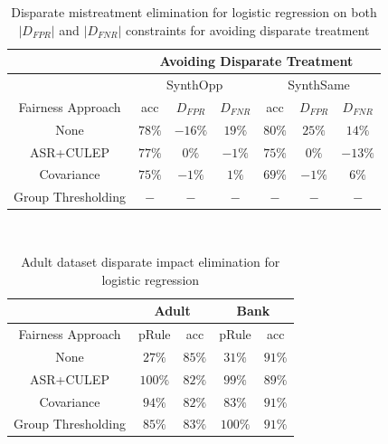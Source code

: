 \documentclass[runningheads]{llncs}
\begin{document}
\begin{table}[!htbp]
      \centering
\begin{tabular}{|c|c|c|c|c|c|c|}
\hline
{} & \multicolumn{6}{c}{Avoiding Disparate Treatment} \vline \\
\hline
{} & \multicolumn{3}{c|}{SynthOpp} & \multicolumn{3}{c|}{SynthSame} \vline \\
\hline
Fairness Approach & acc & $D_{FPR}$ & $D_{FNR}$ & acc & $D_{FPR}$ & $D_{FNR}$ \\
\hline
None & $78\%$ & $-16\%$  & $19\%$  & $80\%$  & $25\%$  & $14\%$ \\
\hline
ASR+CULEP & $77\%$ & $0\%$  & $-1\%$  & $75\%$  & $0\%$  & $-13\%$ \\
\hline
Covariance & $75\%$ & $-1\%$  & $1\%$  & $69\%$  & $-1\%$  & $6\%$ \\
\hline
Group Thresholding & $-$ & $-$  & $-$  & $-$  & $-$  & $-$ \\
\hline 
\end{tabular}
\\
\caption{Disparate mistreatment elimination for logistic regression on both $|D_{FPR}|$ and $|D_{FNR}|$ constraints for avoiding disparate treatment}
\label{tab:avoiddisptreatmenttable}
\end{table}

\begin{table}[!htbp]
      \centering
\begin{tabular}{|c|c|c|c|c|}
\hline
{} & \multicolumn{2}{c|}{Adult} & \multicolumn{2}{c|}{Bank} \vline \\
\hline
Fairness Approach & pRule & acc & pRule & acc\\
\hline
None & $27\%$ & $85\%$  & $31\%$  & $91\%$  \\
\hline
ASR+CULEP & $100\%$ & $82\%$  & $99\%$  & $89\%$  \\
\hline
Covariance & $94\%$ & $82\%$  & $83\%$  & $91\%$  \\
\hline
Group Thresholding & $85\%$ & $83\%$  & $100\%$  & $91\%$ \\
\hline 
\end{tabular}
\\
\caption{Adult dataset disparate impact elimination for logistic regression}
\label{tab:dispimpact}
\end{table}
\end{document}
